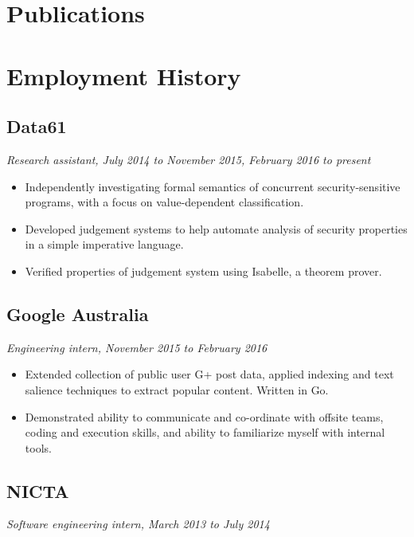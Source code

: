 \documentclass{article}
\begin{document}
\begin{multicols*}{2}
\begin{description}[leftmargin=12pt, itemsep=-2pt]
\end{description}

\section*{Publications}

\nocite{*}
\printbibliography[heading=none]

\vfill

\section*{Employment History}

\subsection*{Data61}
\textit{Research assistant, July 2014 to November 2015, February 2016 to present}

\begin{itemize}[leftmargin=12pt, itemsep=-2pt, topsep=-4pt]
 \item {
  Independently investigating formal semantics of concurrent security-sensitive programs, with a focus on value-dependent classification.
 }
 \item {
  Developed judgement systems to help automate analysis of security properties in a simple imperative language.
 }
 \item {
  Verified properties of judgement system using Isabelle, a theorem prover.
 }
\end{itemize}

\subsection*{Google Australia}
\textit{Engineering intern, November 2015 to February 2016}

\begin{itemize}[leftmargin=12pt, itemsep=-2pt, topsep=-4pt]
 \item {
  Extended collection of public user G+ post data, applied indexing and text salience techniques to extract popular content. Written in Go.
 }
 \item {
  Demonstrated ability to communicate and co-ordinate with offsite teams, coding and execution skills, and ability to familiarize myself with internal tools.
 }
\end{itemize}

\subsection*{NICTA}
\textit{Software engineering intern, March 2013 to July 2014}


\end{multicols*}
\end{document}
